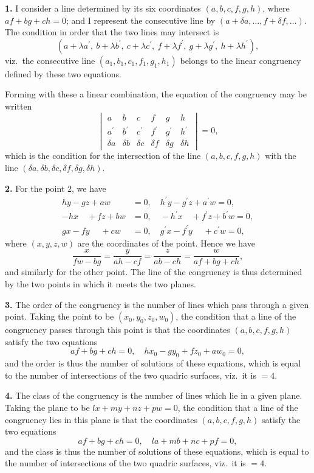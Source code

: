 \documentclass[11pt,a4paper]{book}
\begin{document}
\textbf{1.} I consider a line determined by its six coordinates $(a, b, c, f, g, h)$, where
$af + bg + ch = 0$; and I represent the consecutive line by $(a + \delta a, \ldots, f + \delta f, \ldots)$.
The condition in order that the two lines may intersect is
\[
(a + \lambda a^\prime,\ b + \lambda b^\prime,\ c + \lambda c^\prime,\ f + \lambda f^\prime,\ g + \lambda g^\prime,\ h + \lambda h^\prime),
\]
viz.~the consecutive line $(a_1, b_1, c_1, f_1, g_1, h_1)$ belongs to the linear congruency defined
by these two equations.

Forming with these a linear combination, the equation of the congruency may
be written
\[
\begin{vmatrix}
a & b & c & f & g & h \\
a^\prime & b^\prime & c^\prime & f^\prime & g^\prime & h^\prime \\
\delta a & \delta b & \delta c & \delta f & \delta g & \delta h
\end{vmatrix} = 0,
\]
which is the condition for the intersection of the line $(a, b, c, f, g, h)$ with the line
$(\delta a, \delta b, \delta c, \delta f, \delta g, \delta h)$.

\textbf{2.} For the point $2$, we have
\begin{align*}
hy - gz + aw &= 0, \quad h^\prime y - g^\prime z + a^\prime w = 0,\\
-hx\quad + fz + bw &= 0, \quad -h^\prime x\quad + f^\prime z + b^\prime w = 0,\\
gx - fy\quad\; + cw &= 0, \quad g^\prime x - f^\prime y\quad\; + c^\prime w = 0,
\end{align*}
where $(x, y, z, w)$ are the coordinates of the point. Hence we have
\[
\frac{x}{fw - bg} = \frac{y}{ah - cf} = \frac{z}{ab - ch} = \frac{w}{af + bg + ch},
\]
and similarly for the other point. The line of the congruency is thus determined
by the two points in which it meets the two planes.

\textbf{3.} The order of the congruency is the number of lines which pass through
a given point. Taking the point to be $(x_0, y_0, z_0, w_0)$, the condition that a line of the
congruency passes through this point is that the coordinates $(a, b, c, f, g, h)$ satisfy
the two equations
\[
af + bg + ch = 0, \quad hx_0 - gy_0 + fz_0 + aw_0 = 0,
\]
and the order is thus the number of solutions of these equations, which is equal
to the number of intersections of the two quadric surfaces, viz.~it is $= 4$.

\textbf{4.} The class of the congruency is the number of lines which lie in a given
plane. Taking the plane to be $lx + my + nz + pw = 0$, the condition that a line
of the congruency lies in this plane is that the coordinates $(a, b, c, f, g, h)$ satisfy
the two equations
\[
af + bg + ch = 0, \quad la + mb + nc + pf = 0,
\]
and the class is thus the number of solutions of these equations, which is equal
to the number of intersections of the two quadric surfaces, viz.~it is $= 4$.
\end{document}
